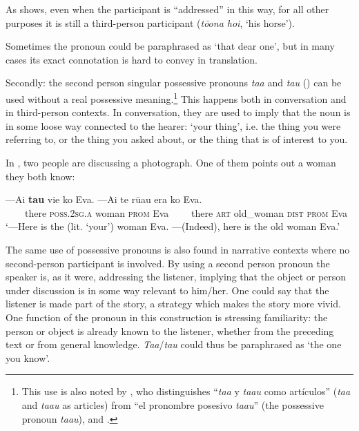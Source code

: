 As  shows, even when the participant is “addressed” in this way, for all other purposes it is still a third-person participant (\textit{tō{\ꞌ}ona hoi}, ‘his horse’).

Sometimes the pronoun could be paraphrased as ‘that dear one’, but in many cases its exact connotation is hard to convey in translation.

Secondly: the second person singular possessive pronouns \textit{ta{\ꞌ}a} and \textit{ta{\ꞌ}u} () can be used without a real possessive meaning.\footnote{\label{fn:166}This use is also noted by \citet[21]{Englert1978}, who distinguishes “\textit{taa} y \textit{taau} como artículos” (\textit{taa} and \textit{taau} as articles) from “el pronombre posesivo \textit{taau}” (the possessive pronoun \textit{taau}), and \citet[48]{Bergmann1963}.} This happens both in conversation and in third-person contexts. In conversation, they are used to imply that the noun is in some loose way connected to the hearer: ‘your thing’, i.e. the thing you were referring to, or the thing you asked about, or the thing that is of interest to you.

In , two people are discussing a photograph. One of them points out a woman they both know:

\ea\label{ex:4.8}
\gll —{\ꞌ}Ai \textbf{ta{\ꞌ}u} vi{\ꞌ}e ko Eva. —{\ꞌ}Ai te rū{\ꞌ}au era ko Eva. \\
~~~~there \textsc{poss.2sg.a} woman \textsc{prom} Eva ~~~~there \textsc{art} old\_woman \textsc{dist} \textsc{prom} Eva \\

\glt
‘—Here is the (lit. ‘your’) woman Eva. —(Indeed), here is the old woman Eva.’ \textstyleExampleref{[R416.461–462]}
\z

The same use of possessive pronouns is also found in narrative contexts where no second-person participant is involved. By using a second person pronoun the speaker is, as it were, addressing the listener, implying that the object or person under discussion is in some way relevant to him/her. One could say that the listener is made part of the story, a strategy which makes the story more vivid. One function of the pronoun in this construction is stressing familiarity: the person or object is already known to the listener, whether from the preceding text or from general knowledge. \textit{Ta{\ꞌ}a}/\textit{ta{\ꞌ}u} could thus be paraphrased as ‘the one you know’. 

